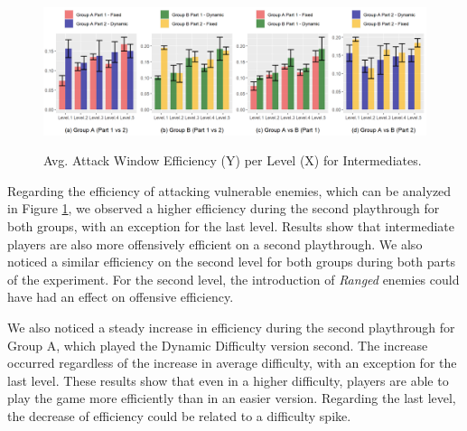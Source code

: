 \begin{figure}[!ht]
    \begin{center}
    \caption{Avg. Attack Window Efficiency (Y) per Level (X) for Intermediates.}
        \includegraphics[width=\textwidth]{figures/attack_window_efficiency-intermediate_players.png}
        \label{fig:result-metric-intermediates-attack-window-efficiency}
    \end{center}
\end{figure}

Regarding the efficiency of attacking vulnerable enemies, which can be analyzed in Figure \ref{fig:result-metric-intermediates-attack-window-efficiency}, we observed a higher efficiency during the second playthrough for both groups, with an exception for the last level. Results show that intermediate players are also more offensively efficient on a second playthrough. We also noticed a similar efficiency on the second level for both groups during both parts of the experiment. For the second level, the introduction of \emph{Ranged} enemies could have had an effect on offensive efficiency.

We also noticed a steady increase in efficiency during the second playthrough for Group A, which played the Dynamic Difficulty version second. The increase occurred regardless of the increase in average difficulty, with an exception for the last level. These results show that even in a higher difficulty, players are able to play the game more efficiently than in an easier version. Regarding the last level, the decrease of efficiency could be related to a difficulty spike.

